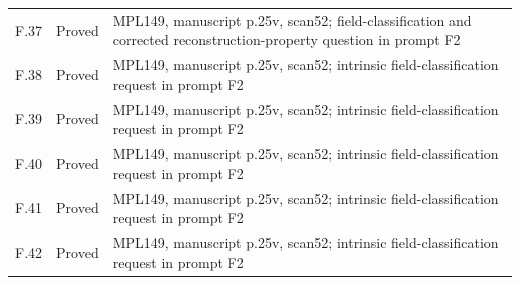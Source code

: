 {\begin{longtable}{p{1.9cm}p{1.7cm}p{10.3cm}}
F.37 & Proved & MPL149, manuscript p.25v, scan52; field-classification and corrected reconstruction-property question in prompt F2 \\
F.38 & Proved & MPL149, manuscript p.25v, scan52; intrinsic field-classification request in prompt F2 \\
F.39 & Proved & MPL149, manuscript p.25v, scan52; intrinsic field-classification request in prompt F2 \\
F.40 & Proved & MPL149, manuscript p.25v, scan52; intrinsic field-classification request in prompt F2 \\
F.41 & Proved & MPL149, manuscript p.25v, scan52; intrinsic field-classification request in prompt F2 \\
F.42 & Proved & MPL149, manuscript p.25v, scan52; intrinsic field-classification request in prompt F2 \\
\bottomrule\end{longtable}
}
